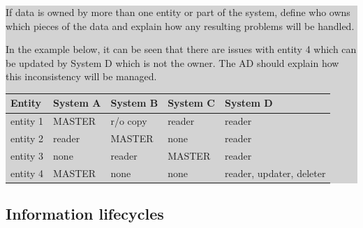 \documentclass[a4paper,11pt]{report}
\newcommand{\instructions}[1]{
  \noindent\colorbox{lightgray}{%
    \parbox{\linewidth}{%
      #1
    }%
  }%
 \vspace{0.1cm}
}
\begin{document}
\instructions{
If data is owned by more than one entity or part of the system, define
who owns which pieces of the data and explain how any resulting
problems will be handled.

In the example below, it can be seen that there are issues with entity
4 which can be updated by System D which is not the owner. The AD
should explain how this inconsistency will be managed.

\begin{center}
  \begin{tabular}[h!]{| p{0.1\textwidth} | p{0.15\textwidth} | p{0.15\textwidth} | p{0.15\textwidth} | p{0.15\textwidth} |}
    \hline
    \rowcolor{gray}
    Entity & System A & System B & System C & System D \\
    \hline
    \hline
    entity 1 & MASTER & r/o copy & reader  & reader \\
   \hline
    entity 2 &reader & MASTER & none & reader\\
   \hline
    entity 3 &none & reader & MASTER & reader \\
   \hline
    entity 4 &MASTER &none & none & reader, updater, deleter\\
   \hline
 \end{tabular}
\end{center}

}

\subsection{Information lifecycles}
\label{sec:inform-lifecycl}
\end{document}
